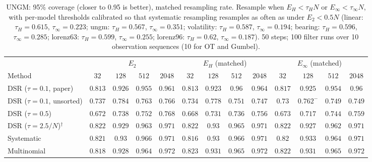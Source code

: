 \begin{table}[ht]
\centering
\small
\caption{UNGM: 95\% coverage (closer to 0.95 is better), matched resampling rate. Resample when $E_H<\tau_HN$ or $E_\infty<\tau_\infty N$, with per-model thresholds calibrated so that systematic resampling resamples as often as under $E_2<0.5N$ (linear: $\tau_H{=}0.615$, $\tau_\infty{=}0.223$; ungm: $\tau_H{=}0.567$, $\tau_\infty{=}0.351$; volatility: $\tau_H{=}0.587$, $\tau_\infty{=}0.194$; bearing: $\tau_H{=}0.596$, $\tau_\infty{=}0.285$; lorenz63: $\tau_H{=}0.599$, $\tau_\infty{=}0.255$; lorenz96: $\tau_H{=}0.62$, $\tau_\infty{=}0.187$). 50 steps; 100 filter runs over 10 observation sequences (10 for OT and Gumbel).}
\label{tab:trigger-matched-ungm-coverage95}
\begin{adjustbox}{max width=\linewidth}
\begin{tabular}{lcccc|cccc|cccc}
\toprule
 & \multicolumn{4}{c}{$E_2$} & \multicolumn{4}{c}{$E_H$ (matched)} & \multicolumn{4}{c}{$E_\infty$ (matched)} \\
\cmidrule(lr){2-5} \cmidrule(lr){6-9} \cmidrule(lr){10-13}
Method & $32$ & $128$ & $512$ & $2048$ & $32$ & $128$ & $512$ & $2048$ & $32$ & $128$ & $512$ & $2048$ \\
\midrule
DSR ($\tau{=}0.1$, paper) & $0.813$ & $\mathbf{0.926}$ & $0.955$ & $0.961$ & $0.813$ & $0.923$ & $0.96$ & $0.964$ & $\mathbf{0.817}$ & $0.925$ & $\mathbf{0.954}$ & $\mathbf{0.96}$ \\
DSR ($\tau{=}0.1$, unsorted) & $\mathbf{0.737}$ & $\mathbf{0.784}$ & $\mathbf{0.763}$ & $\mathbf{0.766}$ & $0.734$ & $0.778$ & $0.751$ & $0.747$ & $0.73$ & $0.762^{-}$ & $0.749$ & $0.749$ \\
DSR ($\tau{=}0.5$) & $0.672$ & $\mathbf{0.738}$ & $\mathbf{0.752}$ & $\mathbf{0.768}$ & $0.668$ & $0.731$ & $0.736$ & $0.756$ & $\mathbf{0.673}$ & $0.717$ & $0.744$ & $0.759$ \\
DSR ($\tau{=}2.5/N$)$^\dagger$ & $0.822$ & $0.929$ & $0.963$ & $0.971$ & $\mathbf{0.822}$ & $\mathbf{0.93}$ & $0.965$ & $\mathbf{0.971}$ & $\mathbf{0.822}$ & $0.927$ & $\mathbf{0.962}$ & $\mathbf{0.971}$ \\
\midrule
Systematic & $\mathbf{0.821}$ & $0.93$ & $0.966$ & $0.971$ & $0.816$ & $0.93$ & $0.966$ & $\mathbf{0.971}$ & $0.82$ & $\mathbf{0.933}$ & $\mathbf{0.964}$ & $\mathbf{0.971}$ \\
Multinomial & $0.818$ & $0.928$ & $\mathbf{0.964}$ & $\mathbf{0.972}$ & $\mathbf{0.823}$ & $0.931$ & $0.965$ & $0.972$ & $0.822$ & $\mathbf{0.931}$ & $0.965$ & $0.972$ \\

\end{tabular}
\end{adjustbox}
\end{table}

